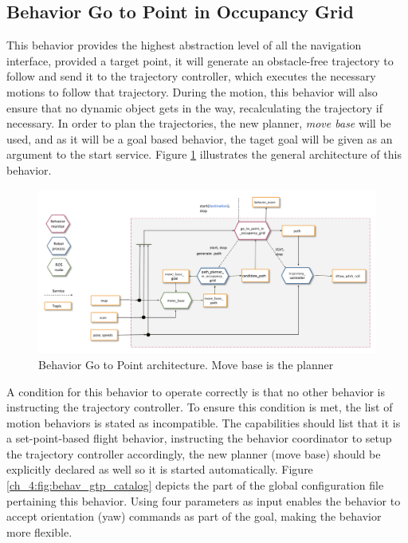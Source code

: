 \subsection{Behavior Go to Point in Occupancy Grid} \label{ch_4:subsect:behav_gtp}

  This behavior provides the highest abstraction level of all the navigation interface, provided a target point, it will generate an obstacle-free trajectory to follow and send it to the trajectory controller, which executes the necessary motions to follow that trajectory. During the motion, this behavior will also ensure that no dynamic object gets in the way, recalculating the trajectory if necessary. In order to plan the trajectories, the new planner, \textit{move base} will be used, and as it will be a goal based behavior, the taget goal will be given as an argument to the start service. Figure \ref{ch_4:fig:behav_gtp} illustrates the general architecture of this behavior.

  \begin{figure}[h]
    \centering
    \includegraphics[width=\textwidth]{./Figures/BehaviorGTPArquitecture.png}
    \caption{Behavior Go to Point architecture. Move base is the planner}
    \label{ch_4:fig:behav_gtp}
  \end{figure}

  A condition for this behavior to operate correctly is that no other behavior is instructing the trajectory controller. To ensure this condition is met, the list of motion behaviors is stated as incompatible. The capabilities should list that it is a set-point-based flight behavior, instructing the behavior coordinator to setup the trajectory controller accordingly, the new planner (move base) should be explicitly declared as well so it is started automatically. Figure \ref{ch_4:fig:behav_gtp_catalog} depicts the part of the global configuration file pertaining this behavior. Using four parameters as input enables the behavior to accept orientation (yaw) commands as part of the goal, making the behavior more flexible.

